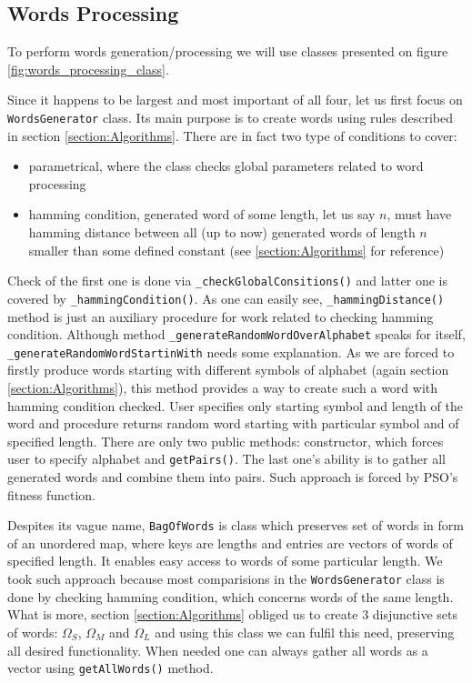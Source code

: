 \documentclass{article}
\begin{document}
%
%
\newpage
\subsection{Words Processing}
To perform words generation/processing we will use classes presented on figure \ref{fig:words_processing_class}.

Since it happens to be largest and most important of all four, let us first focus on \texttt{WordsGenerator} class. Its main purpose is to create words using rules described in section \ref{section:Algorithms}. There are in fact two type of conditions to cover:
\begin{itemize}
\item parametrical, where the class checks global parameters related to word processing
\item hamming condition, generated word of some length, let us say $n$, must have hamming distance between all (up to now) generated words of length $n$ smaller than some defined constant (see \ref{section:Algorithms} for reference)
\end{itemize}

Check of the first one is done via \texttt{\_checkGlobalConsitions()} and latter one is covered by \texttt{\_hammingCondition()}. As one can easily see, \texttt{\_hammingDistance()} method is just an auxiliary procedure for work related to checking hamming condition. Although method \texttt{\_generateRandomWordOverAlphabet} speaks for itself, \texttt{\_generateRandomWordStartinWith} needs some explanation. As we are forced to firstly produce words starting with different symbols of alphabet (again section \ref{section:Algorithms}), this method provides a way to create such a word with hamming condition checked. User specifies only starting symbol and length of the word and procedure returns random word starting with particular symbol and of specified length. There are only two public methods: constructor, which forces user to specify alphabet and \texttt{getPairs()}. The last one's ability is to gather all generated words and combine them into pairs. Such approach is forced by PSO's fitness function. 

Despites its vague name, \texttt{BagOfWords} is class which preserves set of words in form of an unordered map, where keys are lengths and entries are vectors of words of specified length. It enables easy access to words of some particular length. We took such approach because most comparisions in the \texttt{WordsGenerator} class is done by checking hamming condition, which concerns words of the same length. What is more, section \ref{section:Algorithms} obliged us to create 3 disjunctive sets of words: $\Omega_S$, $\Omega_M$ and $\Omega_L$ and using this class we can fulfil this need, preserving all desired functionality. When needed one can always gather all words as a vector using \texttt{getAllWords()} method.
\end{document}
